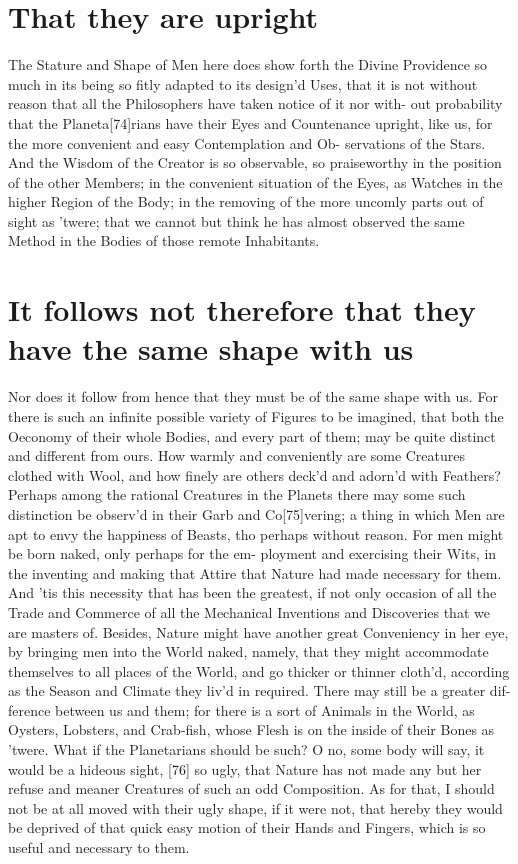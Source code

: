 \documentclass[letterpaper]{book}
\begin{document}
\section{That they are upright}

The Stature and Shape of Men here does show forth the Divine Providence
so much in its being so fitly adapted to its design'd Uses, that it is not
without reason that all the Philosophers have taken notice of it nor with-
out probability that the Planeta[74]rians have their Eyes and Countenance
upright, like us, for the more convenient and easy Contemplation and Ob-
servations of the Stars. And the Wisdom of the Creator is so observable,
so praiseworthy in the position of the other Members; in the convenient
situation of the Eyes, as Watches in the higher Region of the Body; in the
removing of the more uncomly parts out of sight as 'twere; that we cannot
but think he has almost observed the same Method in the Bodies of those
remote Inhabitants.


\section{It follows not therefore that they have the same shape with us} 

Nor does it follow from hence that they must be of the same shape with us.
For there is such an infinite possible variety of Figures to be imagined,
that both the Oeconomy of their whole Bodies, and every part of them; may be
quite distinct and different from ours. How warmly and conveniently are some
Creatures clothed with Wool, and how finely are others deck'd and adorn'd
with Feathers? Perhaps among the rational Creatures in the Planets there may
some such distinction be observ'd in their Garb and Co[75]vering; a thing in
which Men are apt to envy the happiness of Beasts, tho perhaps without
reason. For men might be born naked, only perhaps for the em- ployment and
exercising their Wits, in the inventing and making that Attire that Nature
had made necessary for them. And 'tis this necessity that has been the
greatest, if not only occasion of all the Trade and Commerce of all the
Mechanical Inventions and Discoveries that we are masters of. Besides,
Nature might have another great Conveniency in her eye, by bringing men into
the World naked, namely, that they might accommodate themselves to all
places of the World, and go thicker or thinner cloth'd, according as the
Season and Climate they liv'd in required. There may still be a greater dif-
ference between us and them; for there is a sort of Animals in the World, as
Oysters, Lobsters, and Crab-fish, whose Flesh is on the inside of their
Bones as 'twere. What if the Planetarians should be such? O no, some body
will say, it would be a hideous sight, [76] so ugly, that Nature has not
made any but her refuse and meaner Creatures of such an odd Composition. As
for that, I should not be at all moved with their ugly shape, if it were
not, that hereby they would be deprived of that quick easy motion of their
Hands and Fingers, which is so useful and necessary to them.
\end{document}
